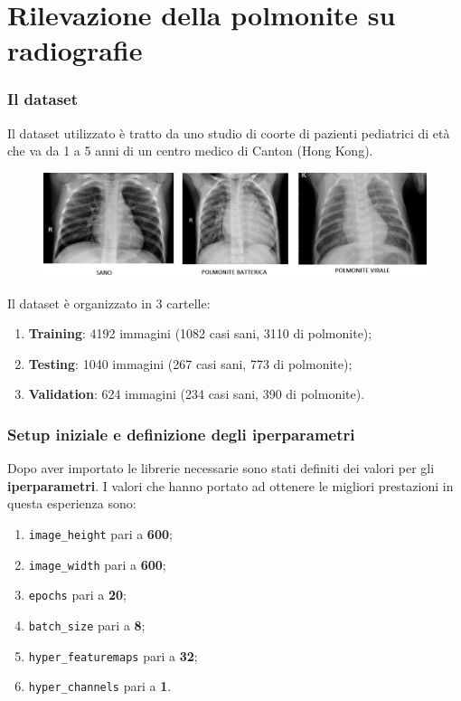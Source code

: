 \documentclass{beamer}
\begin{document}
\section{Rilevazione della polmonite su radiografie}
\begin{frame}
	\frametitle{Il dataset}
	Il dataset utilizzato è tratto
	 da uno studio di coorte di pazienti pediatrici di età che va da 1 a 5 anni di un centro medico di Canton (Hong Kong).
	 \smallskip
	\begin{figure}
		\includegraphics[width=1\textwidth]{sano.jpeg}
	\end{figure}
	Il dataset è organizzato in  3 cartelle: 
	\begin{enumerate}
		\item \textbf{Training}: 4192 immagini (1082 casi sani, 3110 di polmonite);
		\item \textbf{Testing}: 1040 immagini (267 casi sani, 773 di polmonite);
		\item \textbf{Validation}: 624 immagini (234 casi sani, 390 di polmonite).
	\end{enumerate}
	
\end{frame}



\begin{frame}
	\frametitle{Setup iniziale e definizione degli iperparametri}
	Dopo aver importato le librerie necessarie sono stati definiti dei valori per gli \textbf{iperparametri}. 
	I valori che hanno portato ad ottenere le migliori prestazioni in questa esperienza sono:
	\begin{enumerate}
		\item \lstinline[language = Python]{image_height} pari a \textbf{600};
		\item \lstinline[language = Python]{image_width} pari a \textbf{600};
		\item \lstinline[language = Python]{epochs} pari a \textbf{20};
		\item \lstinline[language = Python]{batch_size} pari a \textbf{8};
		\item \lstinline[language = Python]{hyper_featuremaps} pari a \textbf{32};
		\item \lstinline[language = Python]{hyper_channels} pari a \textbf{1}.
	\end{enumerate}

	
\end{frame}
\end{document}
